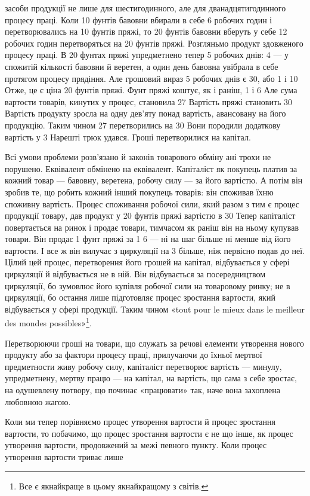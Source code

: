 \parcont{}  %
засоби продукції не лише для шестигодинного, але для дванадцятигодинного
процесу праці. Коли 10 фунтів бавовни вбирали
в себе 6 робочих годин і перетворювались на 10 фунтів пряжі, то
20 фунтів бавовни вберуть у себе 12 робочих годин  перетворяться
на 20 фунтів пряжі. Розгляньмо продукт здовженого процесу
праці. В 20 фунтах пряжі упредметнено тепер 5 робочих днів:
4 — у спожитій кількості бавовни й веретен, а один день бавовна
увібрала в себе протягом процесу прядіння. Але грошовий вираз
5 робочих днів є 30, або 1 і 10
Отже, це є ціна 20 фунтів пряжі. Фунт пряжі коштує, як і
раніш, 1 і 6 Але сума вартости товарів, кинутих у
процес, становила 27 Вартість пряжі становить 30
Вартість продукту зросла на одну дев’яту понад вартість,
авансовану на його продукцію. Таким чином 27 перетворились
на 30 Вони породили додаткову вартість
у 3 Нарешті трюк удався. Гроші перетворилися
на капітал.

Всі умови проблеми розв’язано й законів товарового обміну
ані трохи не порушено. Еквівалент обмінено на еквівалент.
Капіталіст як покупець платив за кожний товар — бавовну,
веретена, робочу силу — за його вартістю. А потім він зробив
те, що робить кожний інший покупець товарів: він споживав
їхню споживну вартість. Процес споживання робочої сили, який
разом з тим є процес продукції товару, дав продукт у 20 фунтів
пряжі вартістю в 30 Тепер капіталіст повертається
на ринок і продає товари, тимчасом як раніш він на ньому
купував товари. Він продає 1 фунт пряжі за 1 6 —
ні на шаг більше ні менше від його вартости. І все ж він вилучає
з циркуляції на 3 більше, ніж первісно подав до неї.
Цілий цей процес, перетворення його грошей на капітал, відбувається
у сфері циркуляції й відбувається не в ній. Він відбувається
за посередництвом циркуляції, бо зумовлює його купівля
робочої сили на товаровому ринку; не в циркуляції, бо остання
лише підготовляє процес зростання вартости, який відбувається
у сфері продукції. Таким чином «tout pour le mieux dans le meilleur
des mondes possibles»\footnote*{
Все є якнайкраще в цьому якнайкращому з світів. 
}.

Перетворюючи гроші на товари, що служать за речові
елементи утворення нового продукту або за фактори процесу
праці, прилучаючи до їхньої мертвої предметности живу робочу
силу, капіталіст перетворює вартість — минулу, упредметнену,
мертву працю — на капітал, на вартість, що сама з себе зростає,
на одушевлену потвору, що починає «працювати» так, наче вона
захоплена любовною жагою.

Коли ми тепер порівняємо процес утворення вартости й процес
зростання вартости, то побачимо, що процес зростання вартости є
не що інше, як процес утворення вартости, продовжений за межі
певного пункту. Коли процес утворення вартости триває лише
\parbreak{}  %
